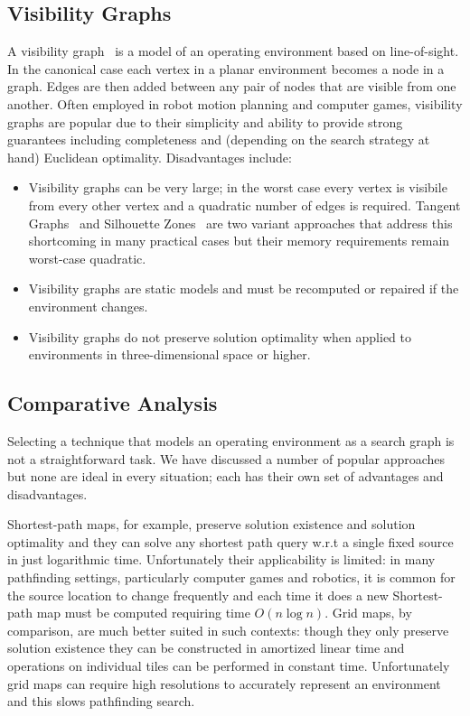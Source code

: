\subsection{Visibility Graphs}
\label{cha::lit::graphs::vis}
A visibility graph~\citep{lozanoperez79} is a model of an operating environment based on
line-of-sight.  In the canonical case each vertex in a planar environment
becomes a node in a graph. Edges are then added between any pair of nodes that
are visible from one another.  Often employed in robot
motion planning and computer games, visibility graphs are popular due to their 
simplicity and ability to provide strong guarantees including completeness and 
(depending on the search strategy at hand) Euclidean optimality. Disadvantages 
include:
\begin{itemize}
\item Visibility graphs can be very large; in the worst case every
vertex is visibile from every other vertex and a quadratic number
of edges is required. Tangent Graphs~\citep{liu92} and Silhouette Zones~\citep{young01b}
are two variant approaches that address this shortcoming in many practical
cases but their memory requirements remain worst-case quadratic.
\item Visibility graphs are static models and must be recomputed or 
repaired if the environment changes.
\item Visibility graphs do not preserve solution optimality when applied
to environments in three-dimensional space or higher.
\end{itemize}

\subsection{Comparative Analysis}
\label{cha::lit::graphs::analysis}
Selecting a technique that models an operating environment as a search graph is not
a straightforward task. We have discussed a number of popular approaches but none
are ideal in every situation; each has their own set of advantages and disadvantages.

Shortest-path maps, for example, preserve solution existence and solution optimality 
and they can solve any shortest path query w.r.t a single fixed source  in just logarithmic time. 
Unfortunately their applicability is limited: in many pathfinding settings, particularly
computer games and robotics, it is common for the source location to change frequently and
each time it does a new Shortest-path map must be computed requiring time $O(n\log{n})$.
Grid maps, by comparison, are much better suited in such contexts: though they only
preserve solution existence they can be constructed in amortized linear time and operations
on individual tiles can be performed in constant time. Unfortunately grid maps can require
high resolutions to accurately represent an environment and this slows pathfinding search.

